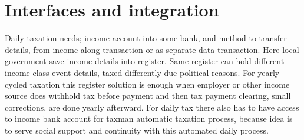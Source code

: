\section{Interfaces and integration}
\label{interfaces_and_integration}
Daily taxation needs; income account into some bank, and met\-hod to transfer
details, from income along transaction or as separate data transaction. Here
local government save income details into register. Same register can hold
different income class event details, taxed differently due political reasons.
For yearly cycled taxation this register solution is enough when employer or
other income source does withhold tax before payment and then tax payment
clearing, small corrections, are done yearly afterward. For daily tax there
also has to have access to income bank account for taxman automatic taxation
process, because idea is to serve social support and continuity with this
automated daily process.

